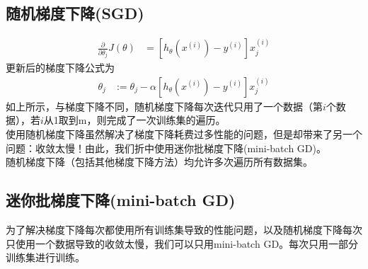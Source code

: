 \subsection{随机梯度下降(SGD)}
\begin{equation}\begin{aligned}
      \frac{\partial} {\partial \theta_j} J(\theta) &= \left[ h_\theta(x^{(i)}) - y^{(i)} \right]x_j^{(i)}
\end{aligned}\end{equation}
更新后的梯度下降公式为
\begin{equation}\begin{aligned}
	\theta_j &:= \theta_j - \alpha\left[ h_\theta(x^{(i)}) - y^{(i)} \right]x_j^{(i)}
\end{aligned}\end{equation}
如上所示，与梯度下降不同，随机梯度下降每次迭代只用了一个数据（第$i$个数据），若$i$从1取到m，则完成了一次训练集的遍历。\\
使用随机梯度下降虽然解决了梯度下降耗费过多性能的问题，但是却带来了另一个问题：收敛太慢！由此，我们折中使用迷你批梯度下降(mini-batch GD)。\\
随机梯度下降（包括其他梯度下降方法）均允许多次遍历所有数据集。

\subsection{迷你批梯度下降(mini-batch GD)}
为了解决梯度下降每次都使用所有训练集导致的性能问题，以及随机梯度下降每次只使用一个数据导致的收敛太慢，我们可以只用mini-batch GD。每次只用一部分训练集进行训练。











